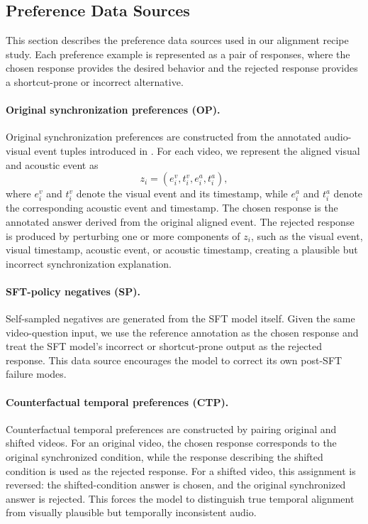 \documentclass{llmxive}
\begin{document}
\subsection{Preference Data Sources}
\label{app:recipe-data}

This section describes the preference data sources used in our alignment recipe study. Each preference example is represented as a pair of responses, where the chosen response provides the desired behavior and the rejected response provides a shortcut-prone or incorrect alternative.

\paragraph{Original synchronization preferences (OP).}
Original synchronization preferences are constructed from the annotated audio-visual event tuples introduced in . For each video, we represent the aligned visual and acoustic event as
\begin{equation}
    z_i = (e_i^v, t_i^v, e_i^a, t_i^a),
\end{equation}
where $e_i^v$ and $t_i^v$ denote the visual event and its timestamp, while $e_i^a$ and $t_i^a$ denote the corresponding acoustic event and timestamp. The chosen response is the annotated answer derived from the original aligned event. The rejected response is produced by perturbing one or more components of $z_i$, such as the visual event, visual timestamp, acoustic event, or acoustic timestamp, creating a plausible but incorrect synchronization explanation.

\paragraph{SFT-policy negatives (SP).}
Self-sampled negatives are generated from the SFT model itself. Given the same video-question input, we use the reference annotation as the chosen response and treat the SFT model's incorrect or shortcut-prone output as the rejected response. This data source encourages the model to correct its own post-SFT failure modes.

\paragraph{Counterfactual temporal preferences (CTP).}
Counterfactual temporal preferences are constructed by pairing original and shifted videos. For an original video, the chosen response corresponds to the original synchronized condition, while the response describing the shifted condition is used as the rejected response. For a shifted video, this assignment is reversed: the shifted-condition answer is chosen, and the original synchronized answer is rejected. This forces the model to distinguish true temporal alignment from visually plausible but temporally inconsistent audio.
\end{document}
